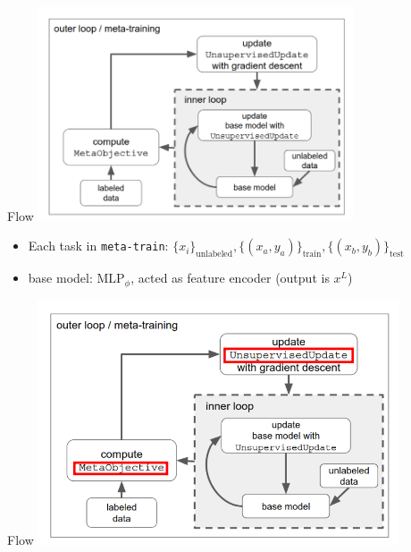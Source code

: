 \documentclass{beamer}
\begin{document}
\begin{frame}{Flow}
  \center \includegraphics[width=0.7\textwidth]{fig/flow.png}
  \begin{itemize}
    \item Each task in \texttt{meta-train}: $\lbrace x_i \rbrace_{\text{unlabeled}}, \lbrace (x_a,y_a) \rbrace_\text{train}, \lbrace (x_b,y_b) \rbrace_\text{test}$
    \item base model: $\text{MLP}_{\phi}$, acted as feature encoder (output is $x^L$)
  \end{itemize}
    
\end{frame}

\begin{frame}{Flow}
  \center \includegraphics[width=0.8\textwidth]{fig/flow-anno.png}
\end{frame}
\end{document}
